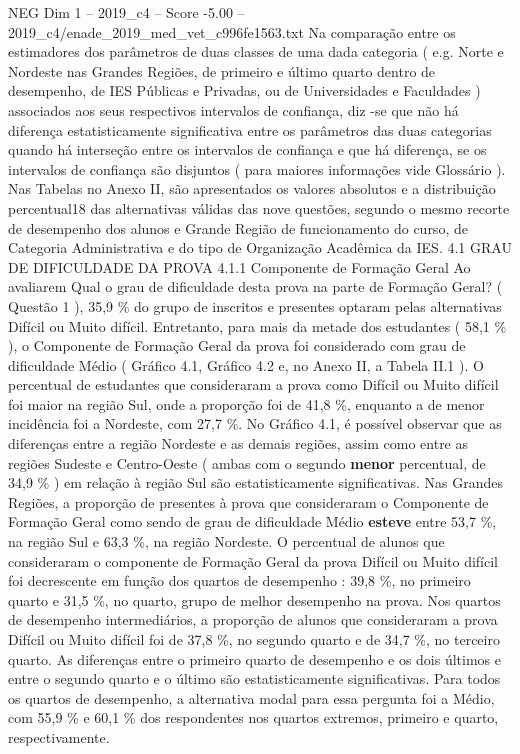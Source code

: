 \begin{textsample}{NEG Dim 1 – 2019\_c4 – Score -5.00 – 2019\_c4/enade\_2019\_med\_vet\_c996fe1563.txt}
Na comparação entre os estimadores dos parâmetros de duas classes de uma dada categoria ( e.g.
Norte e Nordeste nas Grandes Regiões, de primeiro e último quarto dentro de desempenho, de IES Públicas e Privadas, ou de Universidades e Faculdades ) associados aos seus respectivos intervalos de confiança, diz -se que não há diferença estatisticamente significativa entre os parâmetros das duas categorias quando há interseção entre os intervalos de confiança e que há diferença, se os intervalos de confiança são disjuntos ( para maiores informações vide Glossário ).
Nas Tabelas no Anexo II, são apresentados os valores absolutos e a distribuição percentual18 das alternativas válidas das nove questões, segundo o mesmo recorte de desempenho dos alunos e Grande Região de funcionamento do curso, de Categoria Administrativa e do tipo de Organização Acadêmica da IES. 4.1 GRAU DE DIFICULDADE DA PROVA 4.1.1 Componente de Formação Geral Ao avaliarem Qual o grau de dificuldade desta prova na parte de Formação Geral? ( Questão 1 ), 35,9 \% do grupo de inscritos e presentes optaram pelas alternativas Difícil ou Muito difícil.
Entretanto, para mais da metade dos estudantes ( 58,1 \% ), o Componente de Formação Geral da prova foi considerado com grau de dificuldade Médio ( Gráfico 4.1, Gráfico 4.2 e, no Anexo II, a Tabela II.1 ).
O percentual de estudantes que consideraram a prova como Difícil ou Muito difícil foi maior na região Sul, onde a proporção foi de 41,8 \%, enquanto a de menor incidência foi a Nordeste, com 27,7 \%.
No Gráfico 4.1, é possível observar que as diferenças entre a região Nordeste e as demais regiões, assim como entre as regiões Sudeste e Centro-Oeste ( ambas com o segundo \textbf{menor} percentual, de 34,9 \% ) em relação à região Sul são estatisticamente significativas.
Nas Grandes Regiões, a proporção de presentes à prova que consideraram o Componente de Formação Geral como sendo de grau de dificuldade Médio \textbf{esteve} entre 53,7 \%, na região Sul e 63,3 \%, na região Nordeste.
O percentual de alunos que consideraram o componente de Formação Geral da prova Difícil ou Muito difícil foi decrescente em função dos quartos de desempenho : 39,8 \%, no primeiro quarto e 31,5 \%, no quarto, grupo de melhor desempenho na prova.
Nos quartos de desempenho intermediários, a proporção de alunos que consideraram a prova Difícil ou Muito difícil foi de 37,8 \%, no segundo quarto e de 34,7 \%, no terceiro quarto.
As diferenças entre o primeiro quarto de desempenho e os dois últimos e entre o segundo quarto e o último são estatisticamente significativas.
Para todos os quartos de desempenho, a alternativa modal para essa pergunta foi a Médio, com 55,9 \% e 60,1 \% dos respondentes nos quartos extremos, primeiro e quarto, respectivamente.

\end{textsample}

